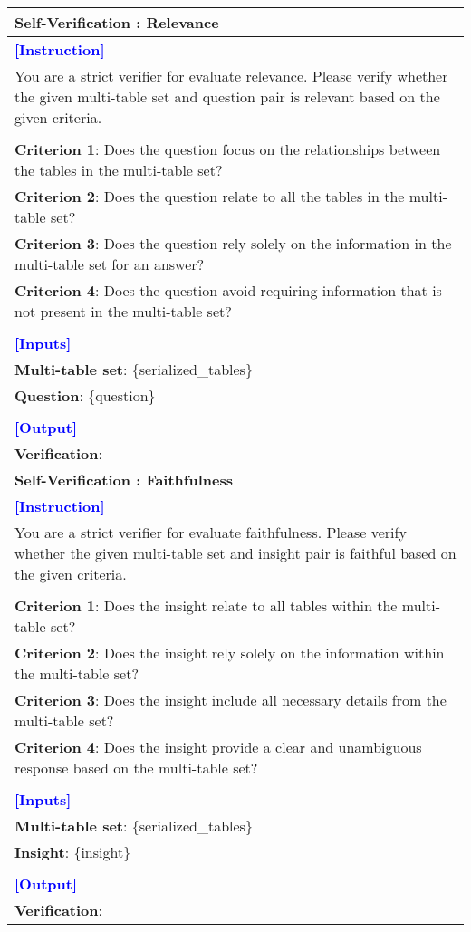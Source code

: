 \begin{table*}[htbp]
\centering
\begin{tabularx}{\textwidth}{X}
\toprule

\textbf{Self-Verification : Relevance} \\ \midrule
\textcolor{blue}{\textbf{[Instruction]}} \\
You are a strict verifier for evaluate relevance. Please verify whether the given multi-table set and question pair is relevant based on the given criteria. \\\\
\textbf{Criterion 1}: Does the question focus on the relationships between the tables in the multi-table set? \\
\textbf{Criterion 2}: Does the question relate to all the tables in the multi-table set? \\
\textbf{Criterion 3}: Does the question rely solely on the information in the multi-table set for an answer? \\
\textbf{Criterion 4}: Does the question avoid requiring information that is not present in the multi-table set? \\\\
\textcolor{blue}{\textbf{[Inputs]}} \\
\textbf{Multi-table set}: \{serialized\_tables\} \\
\textbf{Question}: \{question\} \\\\
\textcolor{blue}{\textbf{[Output]}} \\
\textbf{Verification}: \\

\midrule

\textbf{Self-Verification : Faithfulness} \\ \midrule
\textcolor{blue}{\textbf{[Instruction]}} \\
You are a strict verifier for evaluate faithfulness. Please verify whether the given multi-table set and insight pair is faithful based on the given criteria. \\\\
\textbf{Criterion 1}: Does the insight relate to all tables within the multi-table set? \\
\textbf{Criterion 2}: Does the insight rely solely on the information within the multi-table set? \\
\textbf{Criterion 3}: Does the insight include all necessary details from the multi-table set? \\
\textbf{Criterion 4}: Does the insight provide a clear and unambiguous response based on the multi-table set? \\\\    
\textcolor{blue}{\textbf{[Inputs]}} \\
\textbf{Multi-table set}: \{serialized\_tables\} \\
\textbf{Insight}: \{insight\} \\\\
\textcolor{blue}{\textbf{[Output]}} \\
\textbf{Verification}: \\


\end{tabularx}
\end{table*}
